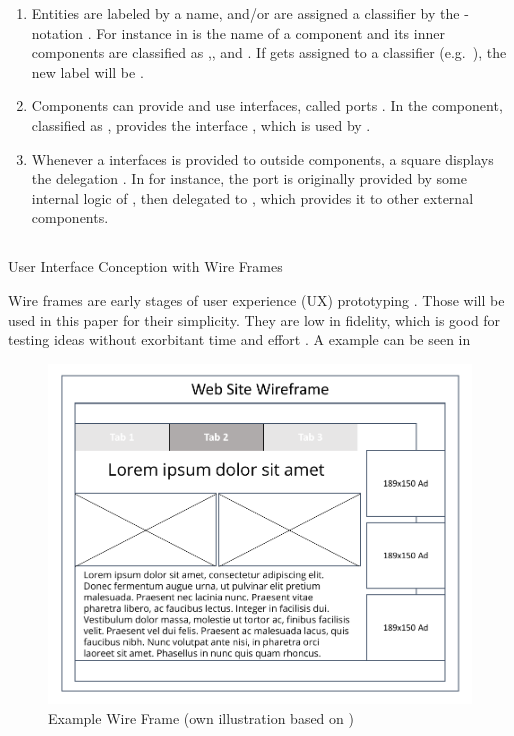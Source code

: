 \begin{enumerate}
    \item Entities are labeled by a name, and/or are assigned a  classifier by the \ssay{:[classifier]}-notation  \parencite[cf.][125]{ObjectManagementGroup.01.03.2015}. For instance in   is the name of a component and its inner components are classified as ,, and . If  gets assigned to a classifier (e.g.~), the new label will be .
    
    \item Components can provide and use interfaces, called ports \parencite[cf.][182-184]{ObjectManagementGroup.01.03.2015}. In  the component, classified as , provides the interface , which is used by .
    
    \item Whenever a interfaces is provided to outside components, a square displays the delegation \parencite[cf.][212]{ObjectManagementGroup.01.03.2015}. In  for instance, the port  is originally provided by some internal logic of , then delegated to , which provides it to other external components. 
\end{enumerate}


\subsection{}{User Interface Conception with Wire Frames}

Wire frames are early stages of user experience (UX) prototyping \parencite[cf.][]{Rosenzweig.2015}. Those will be used in this paper for their simplicity. They are low in fidelity, which is good for testing ideas without exorbitant time and effort \parencite[cf.][]{Platt.2016}. A example can be seen in 

\begin{figure}
    \centering
    \includegraphics[height=.5\textheight]{img/WireFrameEx.pdf}
    \caption{Example Wire Frame (own illustration based on \cite{Rosenzweig.2015})}
    \label{fig:wrEx}
\end{figure}